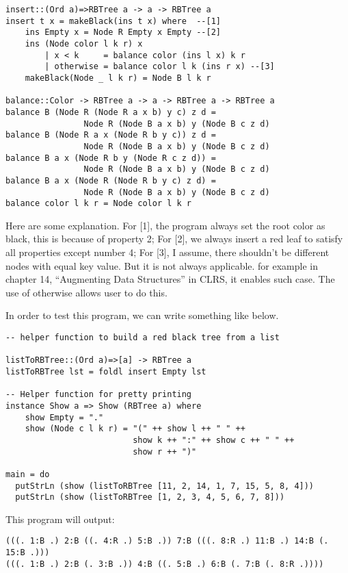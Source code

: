 \documentclass{article}
\begin{document}
\lstset{language=Haskell}
\begin{lstlisting}
insert::(Ord a)=>RBTree a -> a -> RBTree a
insert t x = makeBlack(ins t x) where  --[1]
    ins Empty x = Node R Empty x Empty --[2]
    ins (Node color l k r) x 
        | x < k     = balance color (ins l x) k r
        | otherwise = balance color l k (ins r x) --[3]
    makeBlack(Node _ l k r) = Node B l k r

balance::Color -> RBTree a -> a -> RBTree a -> RBTree a
balance B (Node R (Node R a x b) y c) z d = 
                Node R (Node B a x b) y (Node B c z d)
balance B (Node R a x (Node R b y c)) z d = 
                Node R (Node B a x b) y (Node B c z d)
balance B a x (Node R b y (Node R c z d)) = 
                Node R (Node B a x b) y (Node B c z d)
balance B a x (Node R (Node R b y c) z d) = 
                Node R (Node B a x b) y (Node B c z d)
balance color l k r = Node color l k r
\end{lstlisting}

Here are some explanation. For [1], the program always set the root
color as black, this is because of property 2; For [2], we always insert
a red leaf to satisfy all properties except number 4; For [3], I assume, 
there shouldn't be different nodes with equal key value. But it is not always
applicable. for example in chapter 14, ``Augmenting Data Structures'' in CLRS\cite{CLRS}, it enables such case. The use of otherwise allows user to do this.

In order to test this program, we can write something like below.

\begin{lstlisting}
-- helper function to build a red black tree from a list

listToRBTree::(Ord a)=>[a] -> RBTree a
listToRBTree lst = foldl insert Empty lst

-- Helper function for pretty printing
instance Show a => Show (RBTree a) where
    show Empty = "."
    show (Node c l k r) = "(" ++ show l ++ " " ++ 
                          show k ++ ":" ++ show c ++ " " ++ 
                          show r ++ ")"

main = do
  putStrLn (show (listToRBTree [11, 2, 14, 1, 7, 15, 5, 8, 4]))
  putStrLn (show (listToRBTree [1, 2, 3, 4, 5, 6, 7, 8]))
\end{lstlisting}

This program will output:
\begin{verbatim}
(((. 1:B .) 2:B ((. 4:R .) 5:B .)) 7:B (((. 8:R .) 11:B .) 14:B (. 15:B .)))
(((. 1:B .) 2:B (. 3:B .)) 4:B ((. 5:B .) 6:B (. 7:B (. 8:R .))))
\end{verbatim}
\end{document}
